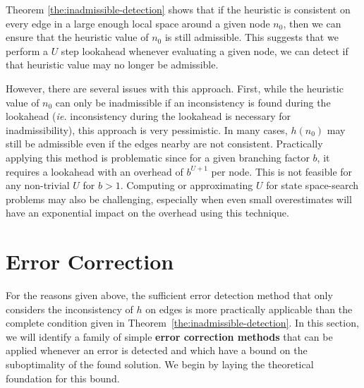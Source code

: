 \documentclass[letterpaper]{article}
\begin{document}
Theorem \ref{the:inadmissible-detection} shows that if the heuristic is consistent on every edge in a large enough local space around a given node $n_0$, then we can ensure that the heuristic value of $n_0$ is still admissible. This suggests that we perform a $U$ step lookahead whenever evaluating a given node, we can detect if that heuristic value may no longer be admissible.

However, there are several issues with this approach. First, while the heuristic value of $n_0$ can only be inadmissible if an inconsistency is found during the lookahead (\textit{ie.} inconsistency during the lookahead is necessary for inadmissibility), this approach is very pessimistic. In many cases, $h(n_0)$ may still be admissible even if the edges nearby are not consistent. Practically applying this method is problematic since for a given branching factor $b$, it requires a lookahead with an overhead of $b^{U+1}$ per node. This is not feasible for any non-trivial $U$ for $b>1$. Computing or approximating $U$ for state space-search problems may also be challenging, especially when even small overestimates will have an exponential impact on the overhead using this technique.



\section{Error Correction}
For the reasons given above, the sufficient error detection method that only considers the inconsistency of $h$ on edges is more practically applicable than the complete condition given in Theorem~\ref{the:inadmissible-detection}.
In this section, we will identify a family of simple \textbf{error correction methods} that can be applied whenever an error is detected and which have a bound on the suboptimality of the found solution.
We begin by laying the theoretical foundation for this bound.
\end{document}
